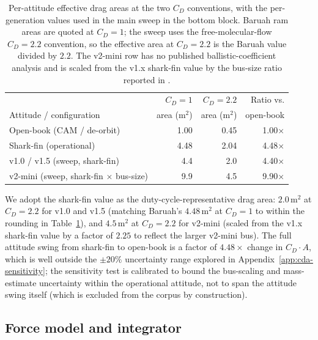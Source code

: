 \documentclass[10pt, letterpaper]{article}
\begin{document}
\begin{table}[ht]
  \centering
  \caption{Per-attitude effective drag areas at the two $C_D$
  conventions, with the per-generation values used in the main sweep
  in the bottom block. Baruah ram areas are quoted at $C_D = 1$; the
  sweep uses the free-molecular-flow $C_D = 2.2$ convention, so the
  effective area at $C_D = 2.2$ is the Baruah value divided by $2.2$.
  The v2-mini row has no published ballistic-coefficient analysis and
  is scaled from the v1.x shark-fin value by the bus-size ratio
  reported in \citet{krebs_starlink_v2mini}.}
  \label{tab:drag-areas}
  \begin{tabular}{lrrr}
    \toprule
                                       & $C_D\!=\!1$ & $C_D\!=\!2.2$ & Ratio vs.\\
    Attitude / configuration           & area (m$^2$) & area (m$^2$) & open-book \\
    \midrule
    Open-book (CAM / de-orbit)\,\citep{baruah2024} & 1.00 & 0.45 & 1.00$\times$ \\
    Shark-fin (operational)\,\citep{baruah2024}    & 4.48 & 2.04 & 4.48$\times$ \\
    \midrule
    v1.0 / v1.5 (sweep, shark-fin)                 & 4.4  & 2.0  & 4.40$\times$ \\
    v2-mini (sweep, shark-fin $\times$ bus-size)   & 9.9  & 4.5  & 9.90$\times$ \\
    \bottomrule
  \end{tabular}
\end{table}

We adopt the shark-fin value as the duty-cycle-representative drag
area: $2.0\,$m$^2$ at $C_D = 2.2$ for v1.0 and v1.5 (matching
Baruah's $4.48\,$m$^2$ at $C_D = 1$ to within the rounding in
Table~\ref{tab:drag-areas}), and $4.5\,$m$^2$ at $C_D = 2.2$ for
v2-mini (scaled from the v1.x shark-fin value by a factor of $2.25$
to reflect the larger v2-mini bus). The full attitude swing from
shark-fin to open-book is a factor of $4.48\times$ change in
$C_D \cdot A$, which is well outside the $\pm 20\%$ uncertainty range
explored in Appendix~\ref{app:cda-sensitivity}; the sensitivity test
is calibrated to bound the bus-scaling and mass-estimate uncertainty
within the operational attitude, not to span the attitude swing
itself (which is excluded from the corpus by construction).

\subsection{Force model and integrator}
\label{sec:methods-forcemodel}
\end{document}
